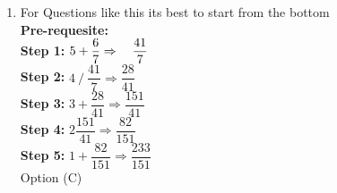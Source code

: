 \begin{multicols}{2}
\begin{enumerate}[label={\arabic*.}]
    \item For Questions like this its best to start from the bottom \\
    \textbf{Pre-requesite:} \\
     \textbf{Step 1:} \hspace{10px}\( 5 + \dfrac{6}{7} \Rightarrow \hspace{10px} \dfrac{41}{7}\) \vspace{5px} \\
     \textbf{Step 2:} \hspace{10px}\(4 \mathbin{/} \dfrac{41}{7} \Rightarrow \dfrac{28}{41}  \) \vspace{5px} \\
     \textbf{Step 3:} \hspace{10px}\(3 + \dfrac{28}{41} \Rightarrow \dfrac{151}{41}\) \vspace{5px}\\
     \textbf{Step 4:} \hspace{10px}\(2  \dfrac{151}{41} \Rightarrow \dfrac{82}{151}\) \vspace{5px} \\
     \textbf{Step 5:} \hspace{10px} \( 1 + \dfrac{82}{151} \Rightarrow \dfrac{233}{151}\) \\
    Option (C) 
    

\end{enumerate}
\end{multicols}
